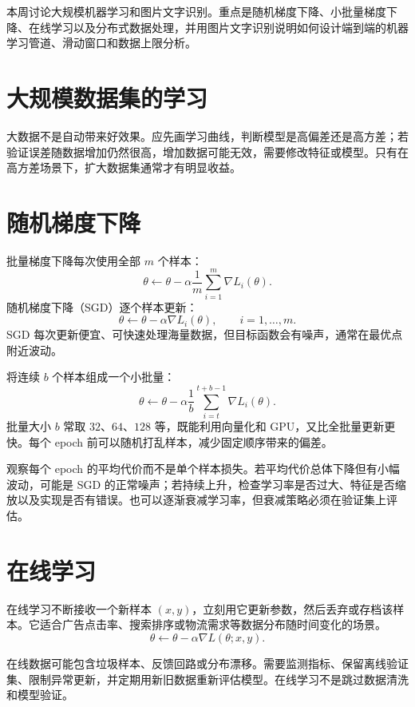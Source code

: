 


\begin{summarybox}
本周讨论大规模机器学习和图片文字识别。重点是随机梯度下降、小批量梯度下降、在线学习以及分布式数据处理，并用图片文字识别说明如何设计端到端的机器学习管道、滑动窗口和数据上限分析。
\end{summarybox}

\section{大规模数据集的学习}
\begin{keybox}[先判断是否真的需要更多数据]
大数据不是自动带来好效果。应先画学习曲线，判断模型是高偏差还是高方差；若验证误差随数据增加仍然很高，增加数据可能无效，需要修改特征或模型。只有在高方差场景下，扩大数据集通常才有明显收益。
\end{keybox}
\section{随机梯度下降}
\begin{definitionbox}[批量与随机梯度下降]
批量梯度下降每次使用全部 $m$ 个样本：
\[
\theta\leftarrow\theta-\alpha\frac1m\sum_{i=1}^{m}\nabla L_i(\theta).
\]
随机梯度下降（SGD）逐个样本更新：
\[
\theta\leftarrow\theta-\alpha\nabla L_i(\theta),
\qquad i=1,\ldots,m.
\]
SGD 每次更新便宜、可快速处理海量数据，但目标函数会有噪声，通常在最优点附近波动。
\end{definitionbox}
\begin{keybox}[小批量梯度下降]
将连续 $b$ 个样本组成一个小批量：
\[
\theta\leftarrow\theta-\alpha\frac1b\sum_{i=t}^{t+b-1}\nabla L_i(\theta).
\]
批量大小 $b$ 常取 $32$、$64$、$128$ 等，既能利用向量化和 GPU，又比全批量更新更快。每个 epoch 前可以随机打乱样本，减少固定顺序带来的偏差。
\end{keybox}
\begin{tipbox}[收敛与学习率]
观察每个 epoch 的平均代价而不是单个样本损失。若平均代价总体下降但有小幅波动，可能是 SGD 的正常噪声；若持续上升，检查学习率是否过大、特征是否缩放以及实现是否有错误。也可以逐渐衰减学习率，但衰减策略必须在验证集上评估。
\end{tipbox}

\section{在线学习}
\begin{definitionbox}[在线学习]
在线学习不断接收一个新样本 $(x,y)$，立刻用它更新参数，然后丢弃或存档该样本。它适合广告点击率、搜索排序或物流需求等数据分布随时间变化的场景。
\[
\theta\leftarrow\theta-\alpha\nabla L(\theta;x,y).
\]
\end{definitionbox}
\begin{mistakebox}[在线学习的风险]
在线数据可能包含垃圾样本、反馈回路或分布漂移。需要监测指标、保留离线验证集、限制异常更新，并定期用新旧数据重新评估模型。在线学习不是跳过数据清洗和模型验证。
\end{mistakebox}

